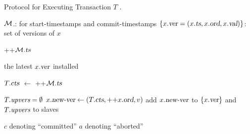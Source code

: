 \setcounter{algorithm}{0}
\begin{algorithm}[H]
  \caption{\rvsims{} Protocol for Executing Transaction $T$ .}
  \begin{algorithmic}[1]
    \Statex $\mathcal{M}$.: for start-timestamps and commit-timestamps
    \Statex $\{x.\textsl{ver} = (x.\textsl{ts}, x.\textsl{ord}, x.\textsl{val})\}$: set of versions of $x$
    \hStatex

    \State \Return ++$\mathcal{M}.\textsl{ts}$
    \EndProcedure
    
      \State \Return the latest $x.\textsl{ver}$ installed \label{line:read-at-master}
    \EndProcedure

    \label{line:call-check-vc}
      \State $T.\textsl{cts}$ $\gets$ ++$\mathcal{M}.\textsl{ts}$ 

      \State $T.\textrm{\it upvers} = \emptyset$    
      \label{line:commit-updates}
      \State $x.\textsl{new-ver} \gets (T.\textsl{cts}, \textrm{++}x.\textsl{ord}, v)$
      \State add $x.\textsl{new-ver}$ to $\{x.\textsl{ver}\}$ and $T.\textrm{\it upvers}$
      \EndFor 
      \State {}  to slaves 
      \label{line:commit-prop}

      \State \Return $c$ denoting ``committed''
    \EndIf
    \State \Return $a$ denoting ``aborted''
    \EndProcedure
  \end{algorithmic}
\end{algorithm}
